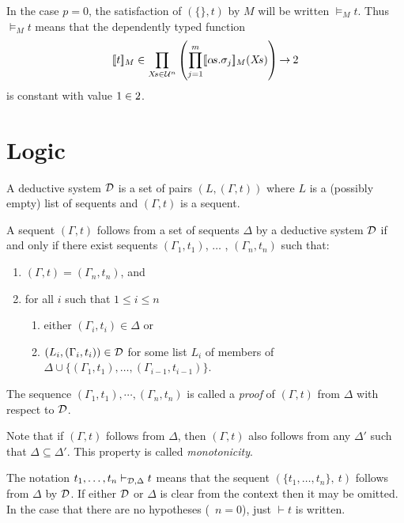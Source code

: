 In the case $p=0$, the satisfaction of $(\{\},t)$ by $M$ will be written
$\models_{M} t$. Thus $\models_{M} t$ means that the dependently typed function
\[
[\![t]\!]_M \in \prod_{X\!s\in{\cal U}^{n}}
\left(\prod_{j=1}^{m}[\![\alpha\!s.\sigma_{j}]\!]_M(X\!s)\right) {\to} \:\mbox{\rm 2}
\]
is constant with value $1\in\mbox{\rm 2}$.

\section{Logic}

A deductive system
${\cal D}$ is a set of pairs $(L,(\Gamma,t))$ where $L$ is a
(possibly empty) list of sequents and $(\Gamma,t)$ is a sequent.

A sequent $(\Gamma,t)$ follows from
a set of sequents
$\Delta$ by a deductive system
${\cal D}$ if
and only if there exist sequents
$(\Gamma_1,t_1)$, $\ldots$ , $(\Gamma_n,t_n)$ such that:
\begin{enumerate}
\item $(\Gamma,t) = (\Gamma_n,t_n)$, and
\item for all $i$ such that $1\leq i\leq n$
\begin{enumerate}
\item either
$(\Gamma_i,t_i)\in \Delta$ or
\item $(L_i,(\Gamma_i,t_i))\in{\cal D}$ for some list $L_i$ of members of
$\Delta\cup\{(\Gamma_1,t_1),\ldots,(\Gamma_{i-1},t_{i-1})\}$.
\end{enumerate}
\end{enumerate}
The sequence $(\Gamma_1,t_1),\cdots,(\Gamma_n,t_n)$
is called a {\it proof\/} of
$(\Gamma,t)$ from $\Delta$ with respect to ${\cal D}$.

Note that if $(\Gamma,t)$ follows from $\Delta$, then $(\Gamma,t)$
also follows from any $\Delta'$ such that $\Delta\subseteq\Delta'$.
This property is called {\it monotonicity\/}.

The notation $t_1,\ldots,t_n\vdash_{{\cal
D},\Delta} t$ means that the sequent $(\{t_1,\ldots,t_n\},\ t)$
follows from $\Delta$ by ${\cal D}$.  If either ${\cal D}$ or $\Delta$
is clear from the context then it may be omitted.  In the case that
there are no hypotheses (\ie\ $n=0$),
just $\vdash t$ is written.


